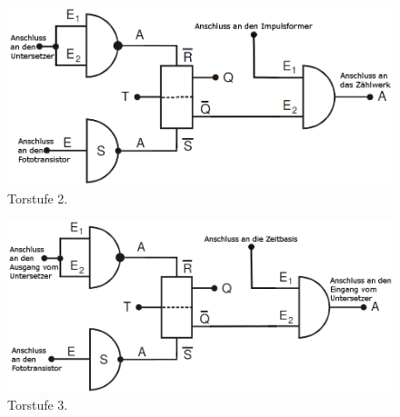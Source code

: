 \begin{figure}
	\centering
	\includegraphics[width=\linewidth-50pt,height=\textheight-50pt,keepaspectratio]{content/Bilder/Torstufe2.png}
	\caption{Torstufe 2\cite{V104}.}
	\label{fig:Aufbau}
\end{figure}
\begin{figure}
	\centering
	\includegraphics[width=\linewidth-50pt,height=\textheight-50pt,keepaspectratio]{content/Bilder/Torstufe3.png}
	\caption{Torstufe 3\cite{V104}.}
	\label{fig:Aufbau}
\end{figure}

